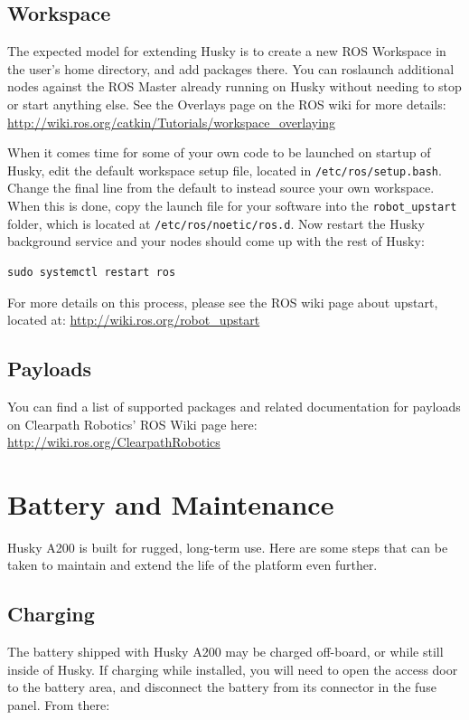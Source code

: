 \documentclass[]{clearpath-latex/clearpath-manual}
\begin{document}
\subsection{Workspace}
The expected model for extending Husky is to create a new ROS Workspace in the user’s home directory,
and add packages there. You can roslaunch additional nodes against the ROS Master already running on Husky
without needing to stop or start anything else. See the Overlays page on the ROS wiki for more details:
\url{http://wiki.ros.org/catkin/Tutorials/workspace_overlaying}

When it comes time for some of your own code to be launched on startup of Husky, edit the default workspace setup file,
located in \lstinline{/etc/ros/setup.bash}. Change the final line from the default to instead source your own workspace.
When this is done, copy the launch file for your software into the \lstinline{robot_upstart} folder, which is located at
\lstinline{/etc/ros/noetic/ros.d}. Now restart the Husky background service and your nodes should come
up with the rest of Husky:

\begin{lstlisting}
sudo systemctl restart ros
\end{lstlisting}

For more details on this process, please see the ROS wiki page about upstart, located at: \url{http://wiki.ros.org/robot_upstart}

\subsection{Payloads}
You can find a list of supported packages and related documentation for payloads on Clearpath Robotics’
ROS Wiki page here: \url{http://wiki.ros.org/ClearpathRobotics}
\newpage

\section{Battery and Maintenance}
Husky A200 is built for rugged, long-term use. Here are some steps that can be
taken to maintain and extend the life of the platform even further.

\subsection{Charging}
The battery shipped with Husky A200 may be charged off-board, or while still inside of Husky.
If charging while installed, you will need to open the access door to the battery area, and
disconnect the battery from its connector in the fuse panel. From there:
\end{document}
